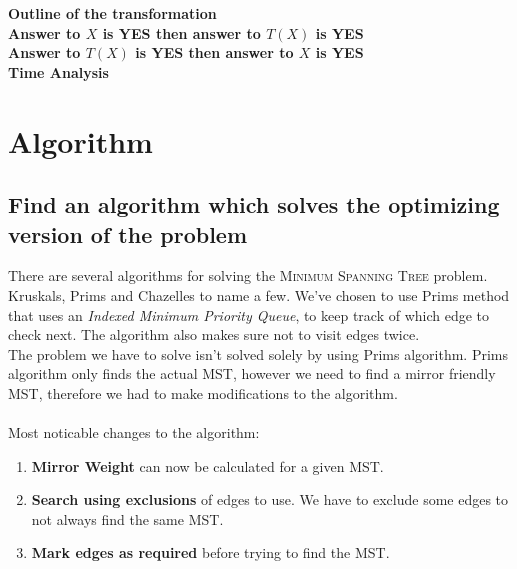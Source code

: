 \documentclass[12pt]{report}
\begin{document}
\textbf{Outline of the transformation}\\

\textbf{Answer to $X$ is YES then answer to $T(X)$ is YES}\\

\textbf{Answer to $T(X)$ is YES then answer to $X$ is YES}\\

\textbf{Time Analysis}

\chapter{Algorithm}
\section{Find an algorithm which solves the optimizing version of the problem}
\label{sec:alg1}
There are several algorithms for solving the \textsc{Minimum Spanning Tree} problem.  Kruskals, Prims and Chazelles to name a few. We've chosen to use Prims method that uses an \emph{Indexed Minimum Priority Queue}, to keep track of which edge to check next. The algorithm also makes sure not to visit edges twice.\\
The problem we have to solve isn't solved solely by using Prims algorithm. Prims algorithm only finds the actual MST, however we need to find a mirror friendly MST, therefore we had to make modifications to the algorithm.\\
\\
Most noticable changes to the algorithm:
\begin{enumerate}
	\item[] \textbf{Mirror Weight} can now be calculated for a given MST.
	\item[] \textbf{Search using exclusions} of edges to use. We have to exclude some edges to not always find the same MST.
	\item[] \textbf{Mark edges as required} before trying to find the MST.
\end{enumerate}
\end{document}
